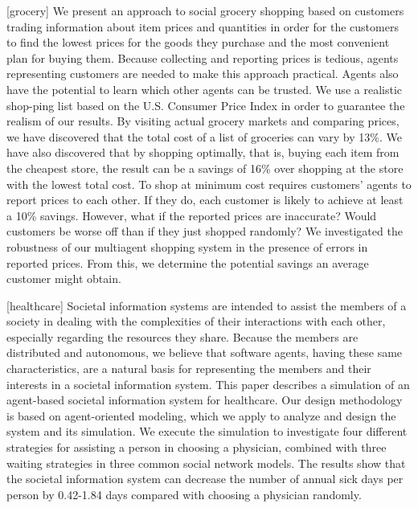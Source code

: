 [grocery]
We present an approach to social grocery shopping based on customers trading information about item prices and quantities in order for the customers to find the lowest prices for the goods they purchase and the most convenient plan for buying them. Because collecting and reporting prices is tedious, agents representing customers are needed to make this approach practical. Agents also have the potential to learn which other agents can be trusted. We use a realistic shop-ping list based on the U.S. Consumer Price Index in order to guarantee the realism of our results. By visiting actual grocery markets and comparing prices, we have discovered that the total cost of a list of groceries can vary by 13\%. We have also discovered that by shopping optimally, that is, buying each item from the cheapest store, the result can be a savings of 16\% over shopping at the store with the lowest total cost. To shop at minimum cost requires customers' agents to report prices to each other. If they do, each customer is likely to achieve at least a 10\% savings. However, what if the reported prices are inaccurate? Would customers be worse off than if they just shopped randomly? We investigated the robustness of our multiagent shopping system in the presence of errors in reported prices. From this, we determine the potential savings an average customer might obtain.

[healthcare]
Societal information systems are intended to assist the members of a society in dealing with the complexities of their interactions with each other, especially regarding the resources they share. Because the members are distributed and autonomous, we believe that software agents, having these same characteristics, are a natural basis for representing the members and their interests in a societal information system.  This paper describes a simulation of an agent-based societal information system for healthcare. Our design methodology is based on agent-oriented modeling, which we apply to analyze and design the system and its simulation. We execute the simulation to investigate four different strategies for assisting a person in choosing a physician, combined with three waiting strategies in three common social network models. The results show that the societal information system can decrease the number of annual sick days per person by 0.42-1.84 days compared with choosing a physician randomly.

